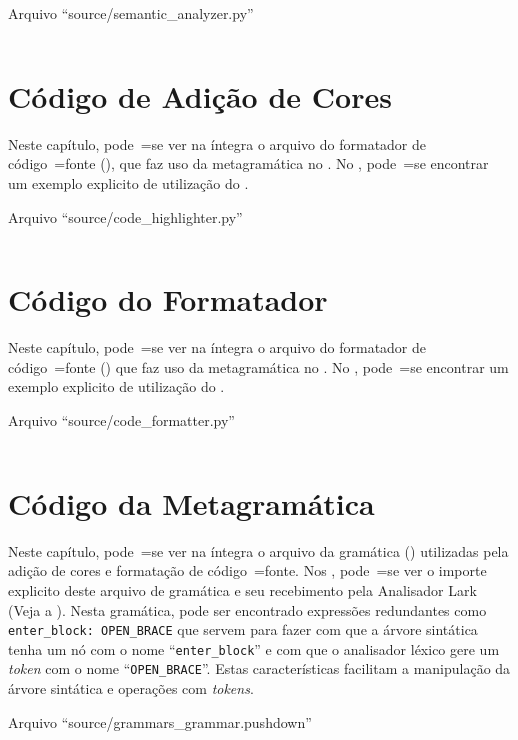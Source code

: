 \begin{code}
\caption{Arquivo ``source/semantic\_analyzer.py''}
\label{semanticAnalyzerPy}
\inputminted[firstline=39,firstnumber=1]{python3}{../source/semantic_analyzer.py}
\end{code}


\chapter{Código de Adição de Cores}

Neste capítulo,
pode~=se ver na íntegra o arquivo do formatador de código~=fonte (),
que faz uso da metagramática no .
No ,
pode~=se encontrar um exemplo explicito de utilização do .
\begin{code}
\caption{Arquivo ``source/code\_highlighter.py''}
\label{codeHighlighterPy}
\inputminted[firstline=39,firstnumber=1]{python3}{../source/code_highlighter.py}
\end{code}


\chapter{Código do Formatador}

Neste capítulo,
pode~=se ver na íntegra o arquivo do formatador de código~=fonte () que faz uso da metagramática no .
No ,
pode~=se encontrar um exemplo explicito de utilização do .
\begin{code}
\caption{Arquivo ``source/code\_formatter.py''}
\label{codeFormatterPy}
\inputminted[firstline=39,firstnumber=1]{python3}{../source/code_formatter.py}
\end{code}


\chapter{Código da Metagramática}

Neste capítulo,
pode~=se ver na íntegra o arquivo da gramática () utilizadas pela adição de cores e
formatação de código~=fonte.
Nos ,
pode~=se ver o importe explicito deste arquivo de gramática e
seu recebimento pela Analisador Lark (Veja a ).
Nesta gramática,
pode ser encontrado expressões redundantes como \texttt{enter_block:
OPEN_BRACE} que servem para fazer com que a árvore sintática tenha um nó com o nome ``\texttt{enter_block}'' e
com que o analisador léxico gere um \textit{token} com o nome ``\texttt{OPEN_BRACE}''.
Estas características facilitam a manipulação da árvore sintática e
operações com \textit{tokens}.
\begin{code}
\caption{Arquivo ``source/grammars\_grammar.pushdown''}
\label{grammarsGrammarPushdown}
\inputminted[firstline=39,firstnumber=1]{antlr}{../source/grammars_grammar.pushdown}
\end{code}

